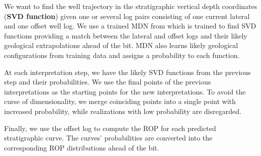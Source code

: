 

We want to find the well trajectory in the stratigraphic vertical depth coordinates (\textbf{SVD function}) given one or several log pairs consisting of one current lateral and one offset well log. 
We use a trained MDN from \cite{multi-modal-journal} which is trained  to find SVD functions providing a match between the lateral and offset logs and their likely geological extrapolations ahead of the bit.  
MDN also learns likely geological configurations from training data and assigns a probability to each function.



At each interpretation step, we have the likely SVD functions from the previous step and their probabilities. We use the final points of the previous interpretations as the starting points for the new interpretations. To avoid the curse of dimensionality, we merge coinciding points into a single point with increased probability, while realizations with low probability are disregarded. 

Finally, we use the offset log to compute the ROP for each predicted stratigraphic curve. The curves' probabilities are converted into the corresponding ROP distributions ahead of the bit.

